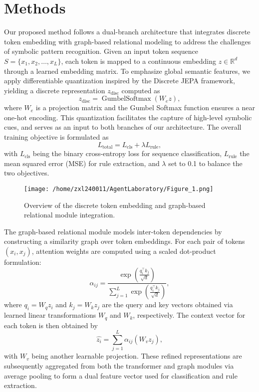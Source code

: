 \documentclass{article}
\begin{document}
\section{Methods}
Our proposed method follows a dual-branch architecture that integrates discrete token embedding with graph-based relational modeling to address the challenges of symbolic pattern recognition. Given an input token sequence \( S = \{ x_1, x_2, \dots, x_L \} \), each token is mapped to a continuous embedding \( z \in \mathbb{R}^d \) through a learned embedding matrix. To emphasize global semantic features, we apply differentiable quantization inspired by the Discrete JEPA framework, yielding a discrete representation \( z_{\text{disc}} \) computed as 
\[
z_{\text{disc}} = \operatorname{GumbelSoftmax}(W_e z),
\]
where \( W_e \) is a projection matrix and the Gumbel Softmax function ensures a near one-hot encoding. This quantization facilitates the capture of high-level symbolic cues, and serves as an input to both branches of our architecture. The overall training objective is formulated as 
\[
L_{\text{total}} = L_{\text{cls}} + \lambda L_{\text{rule}},
\]
with \( L_{\text{cls}} \) being the binary cross-entropy loss for sequence classification, \( L_{\text{rule}} \) the mean squared error (MSE) for rule extraction, and \(\lambda\) set to 0.1 to balance the two objectives.

\begin{figure}[h]
\caption{Overview of the discrete token embedding and graph-based relational module integration.}
\centering
\texttt{[image: /home/zxl240011/AgentLaboratory/Figure\_1.png]}
\label{fig:fig1}
\end{figure}

The graph-based relational module models inter-token dependencies by constructing a similarity graph over token embeddings. For each pair of tokens \( (x_i, x_j) \), attention weights are computed using a scaled dot-product formulation:
\[
\alpha_{ij} = \frac{\exp\left( \frac{q_i^\top k_j}{\sqrt{d}} \right)}{\sum_{j=1}^{L} \exp\left( \frac{q_i^\top k_j}{\sqrt{d}} \right)},
\]
where \( q_i = W_q z_i \) and \( k_j = W_k z_j \) are the query and key vectors obtained via learned linear transformations \( W_q \) and \( W_k \), respectively. The context vector for each token is then obtained by 
\[
\hat{z_i} = \sum_{j=1}^{L} \alpha_{ij} (W_v z_j),
\]
with \( W_v \) being another learnable projection. These refined representations are subsequently aggregated from both the transformer and graph modules via average pooling to form a dual feature vector used for classification and rule extraction.
\end{document}

